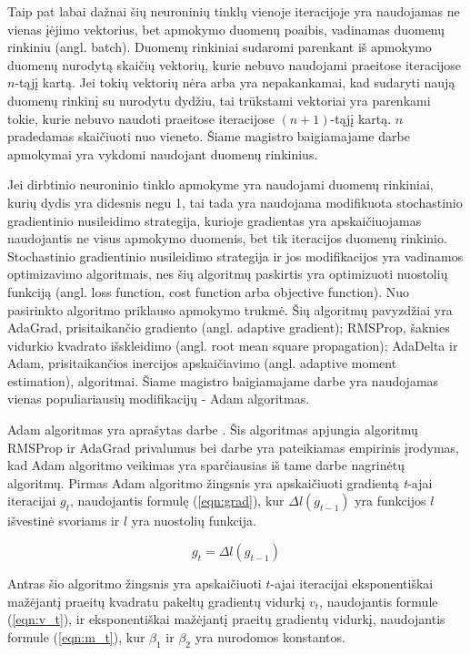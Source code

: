 Taip pat labai dažnai šių neuroninių tinklų vienoje iteracijoje yra naudojamas ne vienas įėjimo vektorius, bet apmokymo duomenų poaibis, vadinamas duomenų rinkiniu (angl. batch). Duomenų rinkiniai sudaromi parenkant iš apmokymo duomenų nurodytą skaičių vektorių, kurie nebuvo naudojami praeitose iteracijose $n$-tąjį kartą. Jei tokių vektorių nėra arba yra nepakankamai, kad sudaryti naują duomenų rinkinį su nurodytu dydžiu, tai trūkstami vektoriai yra parenkami tokie, kurie nebuvo naudoti praeitose iteracijose $(n + 1)$-tąjį kartą. $n$ pradedamas skaičiuoti nuo vieneto. Šiame magistro baigiamajame darbe apmokymai yra vykdomi naudojant duomenų rinkinius.

Jei dirbtinio neuroninio tinklo apmokyme yra naudojami duomenų rinkiniai, kurių dydis yra didesnis negu 1, tai tada yra naudojama modifikuota stochastinio gradientinio nusileidimo strategija, kurioje gradientas yra apskaičiuojamas naudojantis ne visus apmokymo duomenis, bet tik iteracijos duomenų rinkinio. Stochastinio gradientinio nusileidimo strategija ir jos modifikacijos yra vadinamos optimizavimo algoritmais, nes šių algoritmų paskirtis yra optimizuoti nuostolių funkciją (angl. loss function, cost function arba objective function). Nuo pasirinkto algoritmo priklauso apmokymo trukmė. Šių algoritmų pavyzdžiai yra AdaGrad, prisitaikančio gradiento (angl. adaptive gradient); RMSProp, šaknies vidurkio kvadrato išskleidimo (angl. root mean square propagation); AdaDelta ir Adam, prisitaikančios inercijos apskaičiavimo (angl. adaptive moment estimation), algoritmai. Šiame magistro baigiamajame darbe yra naudojamas vienas populiariausių modifikacijų - Adam algoritmas.

Adam algoritmas yra aprašytas darbe \cite{adam}. Šis algoritmas apjungia algoritmų RMSProp ir AdaGrad privalumus bei darbe \cite{adam} yra pateikiamas empirinis įrodymas, kad Adam algoritmo veikimas yra sparčiausias iš tame darbe nagrinėtų algoritmų. Pirmas Adam algoritmo žingsnis yra apskaičiuoti gradientą \textit{t}-ajai iteracijai $g_t$, naudojantis formulę (\ref{eqn:grad}), kur $\Delta l(g_{t-1})$ yra funkcijos $l$ išvestinė svoriams ir $l$ yra nuostolių funkcija.

\begin{equation}
\label{eqn:grad}
	g_t = \Delta l(g_{t-1})
\end{equation}

Antras šio algoritmo žingsnis yra apskaičiuoti $t$-ajai iteracijai eksponentiškai mažėjantį praeitų kvadratu pakeltų gradientų vidurkį $v_t$, naudojantis formule (\ref{eqn:v_t}), ir eksponentiškai mažėjantį praeitų gradientų vidurkį, naudojantis formule (\ref{eqn:m_t}), kur $\beta_1$ ir $\beta_2$ yra nurodomos konstantos.

